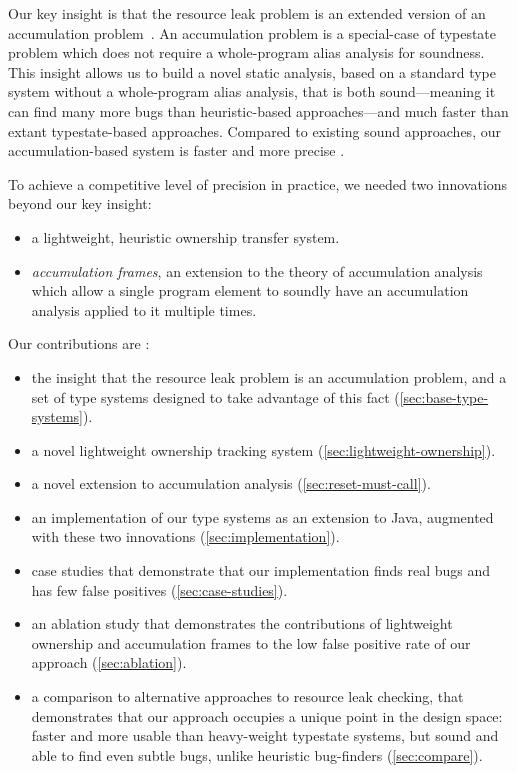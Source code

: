 Our key insight is that the resource leak problem is an extended
version of an accumulation problem~\cite{kellogg20verifying}. An
accumulation problem is a special-case of typestate problem which does
not require a whole-program alias analysis for soundness.  This
insight allows us to build a novel static analysis, based on a
standard type system without a whole-program alias analysis, that is
both sound---meaning it can find many more bugs than heuristic-based
approaches---and much faster than extant typestate-based approaches.
Compared to existing sound approaches, our accumulation-based system
is faster and more precise .

To achieve a competitive level of precision in practice, we needed two
innovations beyond our key insight:
\begin{itemize}
\item a lightweight, heuristic ownership transfer system.
\item \emph{accumulation frames}, an extension to the theory of
  accumulation analysis which allow a single program element to
  soundly have an accumulation analysis applied to it multiple times.
\end{itemize}

Our contributions are :
\begin{itemize}
\item the insight that the resource leak problem is an accumulation problem,
  and a set of type systems designed to take advantage of this fact (\cref{sec:base-type-systems}).
\item a novel lightweight ownership tracking system (\cref{sec:lightweight-ownership}).
\item a novel extension to accumulation analysis (\cref{sec:reset-must-call}).
\item an implementation of our type systems as an extension to Java,
  augmented with these two innovations (\cref{sec:implementation}).
\item case studies that demonstrate that our implementation finds real
  bugs and has few false positives (\cref{sec:case-studies}).
\item an ablation study that demonstrates the contributions of
  lightweight ownership and accumulation frames to the low false
  positive rate of our approach (\cref{sec:ablation}). 
\item a comparison to alternative approaches to resource leak
  checking, that demonstrates that our approach occupies a unique
  point in the design space: faster and more usable than heavy-weight
  typestate systems, but sound and able to find even subtle bugs,
  unlike heuristic bug-finders (\cref{sec:compare}).
\end{itemize}
  
